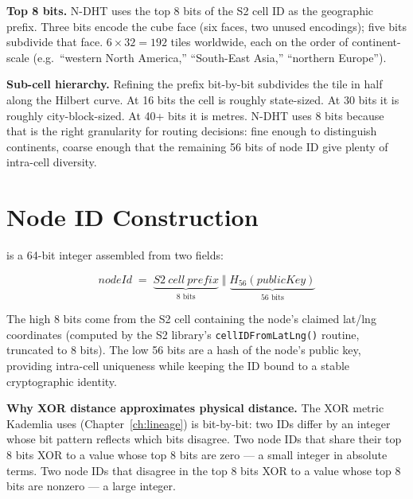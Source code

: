 \documentclass[twoside,nobib]{tufte-book}
\newcommand{\NDHT}{N-DHT\xspace}
\begin{document}
\textbf{Top 8 bits.} \NDHT uses the top 8 bits of the S2 cell ID
as the geographic prefix. Three bits encode the cube face (six
faces, two unused encodings); five bits subdivide that face.
$6 \times 32 = 192$ tiles worldwide, each on the order of
continent-scale (e.g.\ ``western North America,''
``South-East Asia,'' ``northern Europe'').

\textbf{Sub-cell hierarchy.} Refining the prefix bit-by-bit
subdivides the tile in half along the Hilbert curve. At 16 bits
the cell is roughly state-sized. At 30 bits it is roughly
city-block-sized. At 40+ bits it is metres. \NDHT uses 8 bits
because that is the right granularity for routing decisions:
fine enough to distinguish continents, coarse enough that the
remaining 56 bits of node ID give plenty of intra-cell
diversity.

\section{Node ID Construction}

 is a 64-bit integer assembled from two
fields:

\[
\mathit{nodeId} \;=\;
\underbrace{\mathit{S2~cell~prefix}}_{\text{8 bits}}
\;\Vert\;
\underbrace{H_{56}(\mathit{publicKey})}_{\text{56 bits}}
\]

The high 8 bits come from the S2 cell containing the node's
claimed lat/lng coordinates (computed by the S2 library's
\texttt{cellIDFromLatLng()} routine, truncated to 8 bits). The
low 56 bits are a hash of the node's public key, providing
intra-cell uniqueness while keeping the ID bound to a stable
cryptographic identity.

\textbf{Why XOR distance approximates physical distance.} The
XOR metric Kademlia uses (Chapter~\ref{ch:lineage}) is bit-by-bit:
two IDs differ by an integer whose bit pattern reflects which bits
disagree. Two node IDs that share their top 8 bits XOR to a value
whose top 8 bits are zero --- a small integer in absolute terms.
Two node IDs that disagree in the top 8 bits XOR to a value whose
top 8 bits are nonzero --- a large integer.
\end{document}
